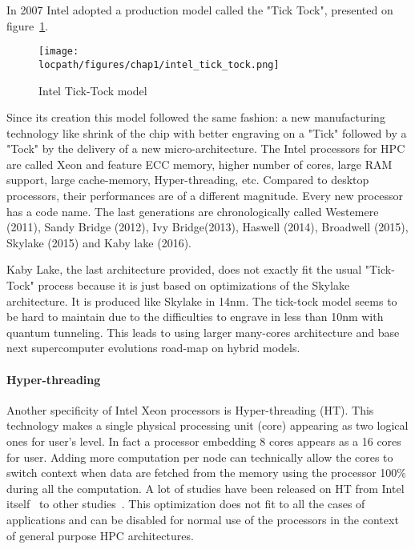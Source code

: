 In 2007 Intel adopted a production model called the "Tick Tock", presented on figure~\ref{fig:1_HPC:intel_tick_tock}.
\begin{figure}[t!]
\begin{center}
\texttt{[image: \\locpath/figures/chap1/intel\_tick\_tock.png]}
\caption{Intel Tick-Tock model}
\label{fig:1_HPC:intel_tick_tock}
\end{center}
\end{figure}
Since its creation this model followed the same fashion: a new manufacturing technology like shrink of the chip with better engraving on a "Tick" followed by a "Tock" by the delivery of  a new micro-architecture.
The Intel processors for HPC are called Xeon and feature ECC memory, higher number of cores, large RAM support, large cache-memory, Hyper-threading, etc. 
Compared to desktop processors, their performances are of a different magnitude.
Every new processor has a code name. 
The last generations are chronologically called Westemere (2011), Sandy Bridge (2012), Ivy Bridge(2013), Haswell (2014), Broadwell (2015), Skylake (2015) and Kaby lake (2016). 

Kaby Lake, the last architecture provided, does not exactly fit the usual "Tick-Tock" process because it is just based on optimizations of the Skylake architecture. 
It is produced like Skylake in 14nm.
The tick-tock model seems to be hard to maintain due to the difficulties to engrave in less than 10nm with quantum tunneling. 
This leads to using larger many-cores architecture and base next supercomputer evolutions road-map on hybrid models. 

\paragraph{Hyper-threading}
Another specificity of Intel Xeon processors is Hyper-threading (HT). 
This technology makes a single physical processing unit (core) appearing as two logical ones for user's level.
In fact a processor embedding 8 cores appears as a 16 cores for user. 
Adding more computation per node can technically allow the cores to switch context when data are fetched from the memory using the processor 100\% during all the computation. 
A lot of studies have been released on HT from Intel itself~\cite{marr2002hyperthreading} to other studies~\cite{bononi2006exploring,leng2002empirical}.
This optimization does not fit to all the cases of applications and can be disabled for normal use of the processors in the context of general purpose HPC architectures.

